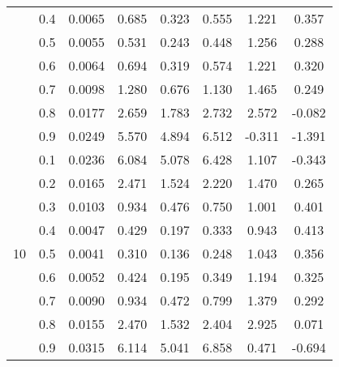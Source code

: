 \documentclass[11pt,a4paper]{report}
\begin{document}
\begin{longtable}{ | c | c || c | c | c | c | c | c | }
 & 0.4 & 0.0065 & 0.685 & 0.323 & 0.555 & 1.221 & 0.357 \\
 & 0.5 & 0.0055 & 0.531 & 0.243 & 0.448 & 1.256 & 0.288 \\
 & 0.6 & 0.0064 & 0.694 & 0.319 & 0.574 & 1.221 & 0.320 \\
 & 0.7 & 0.0098 & 1.280 & 0.676 & 1.130 & 1.465 & 0.249 \\
 & 0.8 & 0.0177 & 2.659 & 1.783 & 2.732 & 2.572 & -0.082 \\
 & 0.9 & 0.0249 & 5.570 & 4.894 & 6.512 & -0.311 & -1.391 \\
 \hline
\multirow{9}{*}{10} & 0.1 & 0.0236 & 6.084 & 5.078 & 6.428 & 1.107 & -0.343 \\
 & 0.2 & 0.0165 & 2.471 & 1.524 & 2.220 & 1.470 & 0.265 \\
 & 0.3 & 0.0103 & 0.934 & 0.476 & 0.750 & 1.001 & 0.401 \\
 & 0.4 & 0.0047 & 0.429 & 0.197 & 0.333 & 0.943 & 0.413 \\
 & 0.5 & 0.0041 & 0.310 & 0.136 & 0.248 & 1.043 & 0.356 \\
 & 0.6 & 0.0052 & 0.424 & 0.195 & 0.349 & 1.194 & 0.325 \\
 & 0.7 & 0.0090 & 0.934 & 0.472 & 0.799 & 1.379 & 0.292 \\
 & 0.8 & 0.0155 & 2.470 & 1.532 & 2.404 & 2.925 & 0.071 \\
 & 0.9 & 0.0315 & 6.114 & 5.041 & 6.858 & 0.471 & -0.694 \\
 \hline
\hline
\end{longtable}
\end{document}
